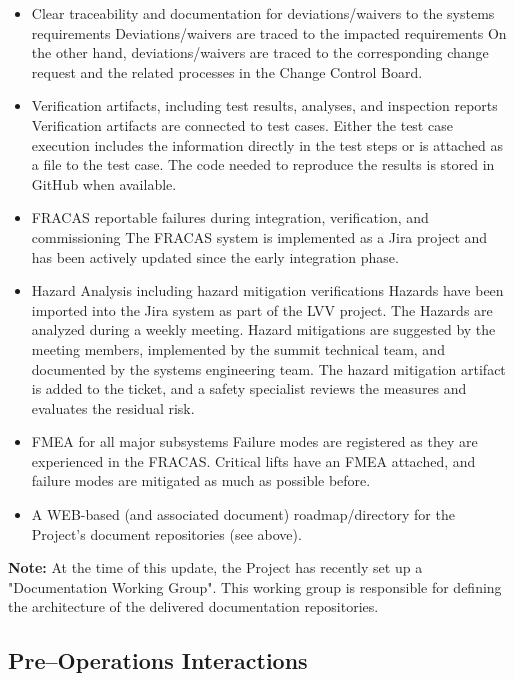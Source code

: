 \begin{itemize}
\begin{itemize}
		\item Clear traceability and documentation for deviations/waivers to the systems requirements
		 Deviations/waivers are traced to the impacted requirements
		 On the other hand, deviations/waivers are traced to the corresponding change request and the related processes in the Change Control Board.

		\item Verification artifacts, including test results, analyses, and inspection reports
		Verification artifacts are connected to test cases.
		Either the test case execution includes the information directly in the test steps or is attached as a file to the test case.
		The code needed to reproduce the results is stored in GitHub when available.

		\item FRACAS reportable failures during integration, verification, and commissioning
		The FRACAS system is implemented as a Jira project and has been actively updated since the early integration phase.

		\item Hazard Analysis including hazard mitigation verifications
		Hazards have been imported into the Jira system as part of the LVV project.  The Hazards are analyzed during a weekly meeting.
		Hazard mitigations are suggested by the meeting members, implemented by the summit technical team, and documented by the systems engineering team.
		The hazard mitigation artifact is added to the ticket, and a safety specialist reviews the measures and evaluates the residual risk.

		\item FMEA for all major subsystems
		Failure modes are registered as they are experienced in the FRACAS.
		Critical lifts have an FMEA attached, and failure modes are mitigated as much as possible before.

	\item A WEB-based (and associated document) roadmap/directory for the Project's document repositories (see above).

\end{itemize}

{\bf Note:} At the time of this update, the Project has recently set up a "Documentation Working Group".  This working group is responsible for defining the architecture of the delivered documentation repositories.

\subsection{Pre--Operations Interactions}


\end{itemize}
